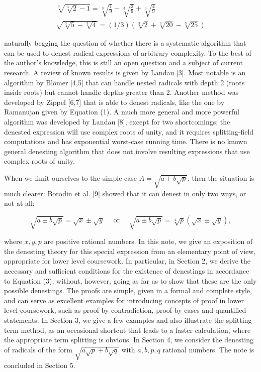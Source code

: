\documentclass[11pt,letterpaper]{article}
\begin{document}
\begin{gather*}
\sqrt[3]{\sqrt[3]{2}-1}=\sqrt[3]{\frac{1}{9}}-\sqrt[3]{\frac{2}{9}}+\sqrt[3]{\frac{4}{9}}  \tag{1}\label{eq:1}\\
\sqrt{\sqrt[3]{5}-\sqrt[3]{4}}=(1 / 3)(\sqrt[3]{2}+\sqrt[3]{20}-\sqrt[3]{25}) \tag{2}\label{eq:2}
\end{gather*}


naturally begging the question of whether there is a systematic algorithm that can be used to denest radical expressions of arbitrary complexity. To the best of the author's knowledge, this is still an open question and a subject of current research. A review of known results is given by Landau [3]. Most notable is an algorithm by Bl\"omer [4,5] that can handle nested radicals with depth 2 (roots inside roots) but cannot handle depths greater than 2. Another method was developed by Zippel [6,7] that is able to denest radicals, like the one by Ramanujan given by Equation (1). A much more general and more powerful algorithm was developed by Landau [8], except for two shortcomings: the denested expression will use complex roots of unity, and it requires splitting-field computations and has exponential worst-case running time. There is no known general denesting algorithm that does not involve resulting expressions that use complex roots of unity.

When we limit ourselves to the simple case $A=\sqrt{a \pm b \sqrt{p}}$, then the situation is much clearer: Borodin et al. [9] showed that it can denest in only two ways, or not at all:


\begin{equation*}
\sqrt{a \pm b \sqrt{p}}=\sqrt{x} \pm \sqrt{y} \quad \text { or } \quad \sqrt{a \pm b \sqrt{p}}=\sqrt[4]{p}(\sqrt{x} \pm \sqrt{y}), \tag{3}\label{eq:3}
\end{equation*}


where $x,y,p$ are positive rational numbers. In this note, we give an exposition of the denesting theory for this special expression from an elementary point of view, appropriate for lower level coursework. In particular, in Section 2, we derive the necessary and sufficient conditions for the existence of denestings in accordance to Equation (3), without, however, going as far as to show that these are the only possible denestings. The proofs are simple, given in a formal and complete style, and can serve as excellent examples for introducing concepts of proof in lower level coursework, such as proof by contradiction, proof by cases and quantified statements. In Section 3, we give a few examples and also illustrate the splitting-term method, as an occasional shortcut that leads to a faster calculation, where the appropriate term splitting is obvious. In Section 4, we consider the denesting of radicals of the form $\sqrt{a \sqrt{p}+b \sqrt{q}}$ with $a, b, p, q$ rational numbers. The note is concluded in Section 5.
\end{document}
